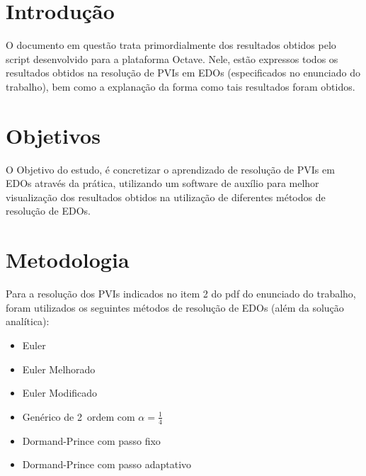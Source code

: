 \documentclass[
	12pt,				%
    oneside,			%
	a4paper,			%
	english,			%
	french,				%
	spanish,			%
	brazil,				%
	]{abntex2}
\begin{document}
\tableofcontents*
\cleardoublepage


\textual


\chapter{Introdução} %

O documento em questão trata primordialmente dos resultados obtidos pelo script desenvolvido para a plataforma Octave. Nele, estão expressos todos os resultados obtidos na resolução de PVIs em EDOs (especificados no enunciado do trabalho), bem como a explanação da forma como tais resultados foram obtidos.

\chapter{Objetivos} %

O Objetivo do estudo, é concretizar o aprendizado de resolução de PVIs em EDOs através da prática, utilizando um software de auxílio para melhor visualização dos resultados obtidos na utilização de diferentes métodos de resolução de EDOs.

\chapter{Metodologia}

Para a resolução dos PVIs indicados no item 2 do pdf do enunciado do trabalho, foram utilizados os seguintes métodos de resolução de EDOs (além da solução analítica):

\begin{itemize}
   \item Euler 
   \item Euler Melhorado
   \item Euler Modificado
   \item Genérico de 2\textordfeminine\ ordem com $\alpha = \frac{1}{4}$
   \item Dormand-Prince com passo fixo
   \item Dormand-Prince com passo adaptativo
\end{itemize}
\end{document}
